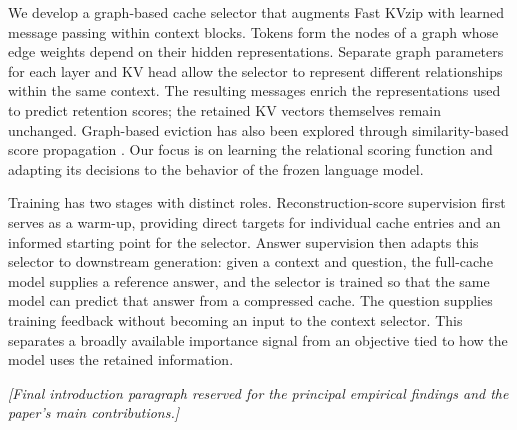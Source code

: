 We develop a graph-based cache selector that augments Fast KVzip with learned message passing within context blocks. Tokens form the nodes of a graph whose edge weights depend on their hidden representations. Separate graph parameters for each layer and KV head allow the selector to represent different relationships within the same context. The resulting messages enrich the representations used to predict retention scores; the retained KV vectors themselves remain unchanged. Graph-based eviction has also been explored through similarity-based score propagation \citep{li2025graphkv}. Our focus is on learning the relational scoring function and adapting its decisions to the behavior of the frozen language model.

Training has two stages with distinct roles. Reconstruction-score supervision first serves as a warm-up, providing direct targets for individual cache entries and an informed starting point for the selector. Answer supervision then adapts this selector to downstream generation: given a context and question, the full-cache model supplies a reference answer, and the selector is trained so that the same model can predict that answer from a compressed cache. The question supplies training feedback without becoming an input to the context selector. This separates a broadly available importance signal from an objective tied to how the model uses the retained information.

\medskip
\noindent\textit{[Final introduction paragraph reserved for the principal empirical findings and the paper's main contributions.]}
